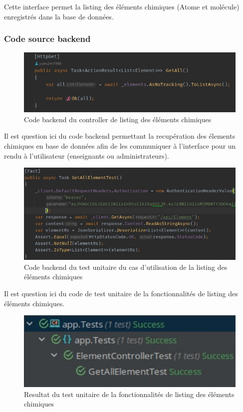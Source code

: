Cette interface permet la listing des éléments chimiques (Atome et molécule) enregistrés dans la base de données.

\subsubsection{Code source backend}

\begin{figure}[H]
	\centering
	\includegraphics[width=1\textwidth]{img/cetl}
	\caption{Code backend du controller de listing des éléments chimiques}
\end{figure}

Il est question ici du code backend permettant la recupération des élements chimiques en base de données afin de les communiquer à l'interface pour un rendu à l'utilisateur (enseignants ou administrateurs).

\begin{figure}[H]
	\centering
	\includegraphics[width=1\textwidth]{img/utetlist2}
	\caption{Code backend du test unitaire du cas d'utilisation de la listing des éléments chimiques}
\end{figure}

Il est question ici du code de test unitaire de la fonctionnalités de listing des éléments chimiques.

\begin{figure}[H]
	\centering
	\includegraphics[width=1\textwidth]{img/utetlist}
	\caption{Resultat du test unitaire de la fonctionnalités de listing des éléments chimiques}
\end{figure}

